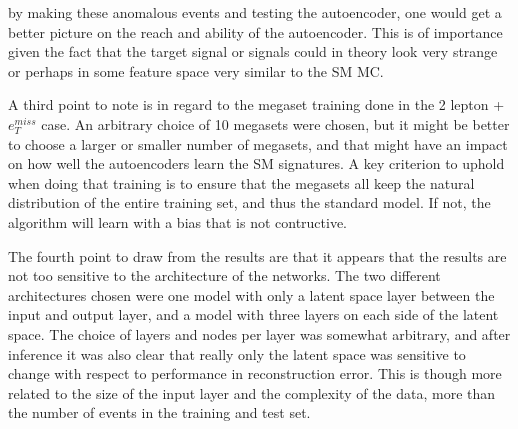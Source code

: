 by making these anomalous events and testing the autoencoder, one would get a better 
picture on the reach and ability of the autoencoder. This is of importance given the 
fact that the target signal or signals could in theory look very strange or perhaps 
in some feature space very similar to the SM MC. \par 
A third point to note is in regard to the megaset training done in the 2 lepton + 
$e_T^{miss}$ case. An arbitrary choice of 10 megasets were chosen, but it might 
be better to choose a larger or smaller number of megasets, and that might have an impact
on how well the autoencoders learn the SM signatures. A key criterion to uphold when 
doing that training is to ensure that the megasets all keep the natural distribution of 
the entire training set, and thus the standard model. If not, the algorithm will learn
with a bias that is not contructive. \par 
The fourth point to draw from the results are that it appears that the results are not 
too sensitive to the architecture of the networks. The two different architectures chosen
were one model with only a latent space layer between the input and output layer, and a model
with three layers on each side of the latent space. The choice of layers and nodes per layer 
was somewhat arbitrary, and after inference it was also clear that really only the latent space
was sensitive to change with respect to performance in reconstruction error. This is though 
more related to the size of the input layer and the complexity of the data, more than 
the number of events in the training and test set. 